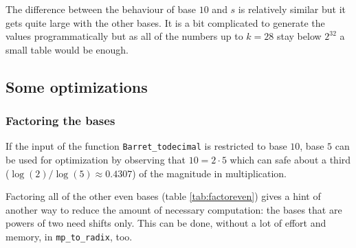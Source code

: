 \documentclass[a4paper,10pt]{article}
\theoremstyle{plain} %
\theoremstyle{definition}
\theoremstyle{remark}
\newcommand*{\smalltt}[1]{\small\texttt{#1}}
\begin{document}
The difference between the behaviour of base $10$ and $s$ is relatively similar but it gets quite large with the other bases. It is a bit complicated to generate the values programmatically but as all of the numbers up to $k=28$ stay below $2^{32}$ a small table would be enough.

\subsection{Some optimizations}\label{subsec:optimizations}

\subsubsection{Factoring the bases}
If the input of the function \smalltt{Barret\_todecimal} is restricted to base $10$, base $5$ can be used for optimization by observing that $10 = 2\cdot5$ which can safe about a third ($\log(2)/\log(5) \approx 0.4307$) of the magnitude in multiplication.

Factoring all of the other even bases (table \ref{tab:factoreven}) gives a hint of another way to reduce the amount of necessary computation: the bases that are powers of two need shifts only. This can be done, without a lot of effort and memory, in \smalltt{mp\_to\_radix}, too.
\end{document}
